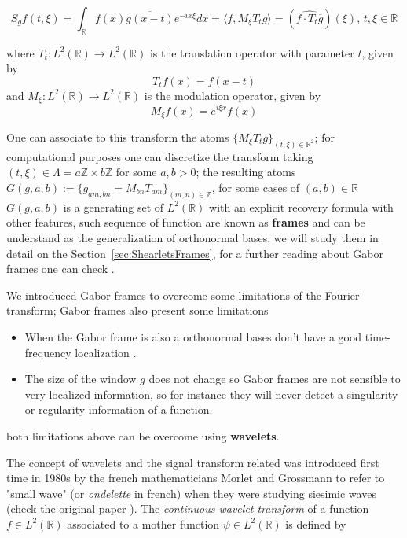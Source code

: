 $$
S_gf(t,\xi)=\int_{\mathbb{R}} f(x)\overline{g(x-t)}e^{-ix\xi}dx=\langle f,M_{\xi}T_tg\rangle = (\widehat{f\cdot T_t\overline{g}})(\xi)\text{,  } t,\xi\in\mathbb{R}
$$

where $T_t:L^2(\mathbb{R})\longrightarrow L^2(\mathbb{R})$ is the translation operator with parameter $t$, given by 
$$
T_tf(x)=f(x-t)
$$
and $M_{\xi}:L^2(\mathbb{R})\longrightarrow L^2(\mathbb{R})$ is the modulation operator, given by 
$$
M_{\xi} f(x)=e^{i\xi x}f(x)
$$

\bigskip 

One can associate to this transform the atoms $\{M_{\xi}T_tg\}_{(t,\xi)\in\mathbb{R}^2}$; for computational purposes one can discretize the transform taking $(t,\xi)\in\Lambda=a\mathbb{Z}\times b\mathbb{Z}$ for some $a,b>0$; the resulting atoms $G(g,a,b):=\{g_{am,bn}=M_{bn}T_{am}\}_{(m,n)\in\mathbb{Z}}$, for some cases of $(a,b)\in\mathbb{R}$ $G(g,a,b)$ is a generating set of $L^2(\mathbb{R})$ with an explicit recovery formula with other features, such sequence of function are known as \textbf{frames} and can be understand as the generalization of orthonormal bases, we will study them in detail on the Section~\ref{sec:ShearletsFrames}, for a further reading about Gabor frames one can check \cite{Gabor}.

\bigskip

We introduced Gabor frames to overcome some limitations of the Fourier transform; Gabor frames also present some limitations
\begin{itemize}
\item When the Gabor frame is also a orthonormal bases don't have a good time-frequency localization \cite{Gabor}.
\item The size of the window $g$ does not change so Gabor frames are not sensible to very localized information, so for instance they will never detect a singularity or regularity information of a function.
\end{itemize} 
both limitations above can be overcome using \textbf{wavelets}.

\bigskip 

The concept of wavelets and the signal transform related was introduced first time 
in 1980s by the french mathematicians Morlet and Grossmann to refer to "small wave" (or \textit{ondelette} in french) when they were studying siesimic waves (check the original paper \cite{Grossman}). The \textit{continuous wavelet transform} of a function $f\in L^2(\mathbb{R})$ associated to a mother function $\psi\in L^2(\mathbb{R})$ is defined by 

